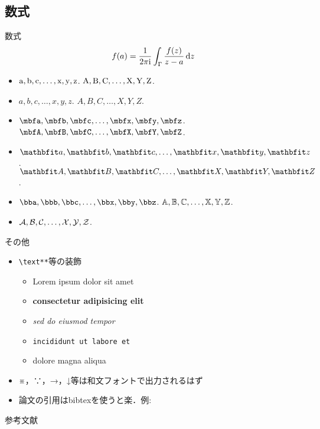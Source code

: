 \documentclass[unicode]{beamer}
\begin{document}
  \subsection{数式}
  \begin{frame}{数式}
    \begin{align}
      f(a) = \frac{1}{2\pi\mathrm{i}} \int_\Gamma \frac{f(z)}{z-a} \dd{z}
    \end{align}
    \begin{itemize}
      \item $\mathrm{a},\mathrm{b},\mathrm{c},\dots,\mathrm{x},\mathrm{y},\mathrm{z}$. $\mathrm{A},\mathrm{B},\mathrm{C},\dots,\mathrm{X},\mathrm{Y},\mathrm{Z}$.
      \item $a,b,c,\dots,x,y,z$. $A,B,C,\dots,X,Y,Z$.
      \item $\bfa,\bfb,\bfc,\dots,\bfx,\bfy,\bfz$. $\bfA,\bfB,\bfC,\dots,\bfX,\bfY,\bfZ$.
      \item $\bma,\bmb,\bmc,\dots,\bmx,\bmy,\bmz$. $\bmA,\bmB,\bmC,\dots,\bmX,\bmY,\bmZ$.
      \item $\bba,\bbb,\bbc,\dots,\bbx,\bby,\bbz$. $\mathbb{A},\mathbb{B},\mathbb{C},\dots,\mathbb{X},\mathbb{Y},\mathbb{Z}$.
      \item $\mathcal{A},\mathcal{B},\mathcal{C},\dots,\mathcal{X},\mathcal{Y},\mathcal{Z}$.
    \end{itemize}
  \end{frame}


  \begin{frame}{その他}
    \begin{itemize}
      \item \texttt{\textbackslash text**}等の装飾
      \begin{itemize}
        \item Lorem ipsum dolor sit amet
        \item \textbf{consectetur adipisicing elit}
        \item \textit{sed do eiusmod tempor}
        \item \texttt{incididunt ut labore et}
        \item \alert{dolore magna aliqua}
      \end{itemize}
      \item ※，∵，→，↓等は和文フォントで出力されるはず
      \item 論文の引用はbibtexを使うと楽．例: \cite{MR3642670}
    \end{itemize}
  \end{frame}


\appendix
  \begin{frame}[allowframebreaks]{参考文献}
    \scriptsize
    
    
  \end{frame}
\end{document}
